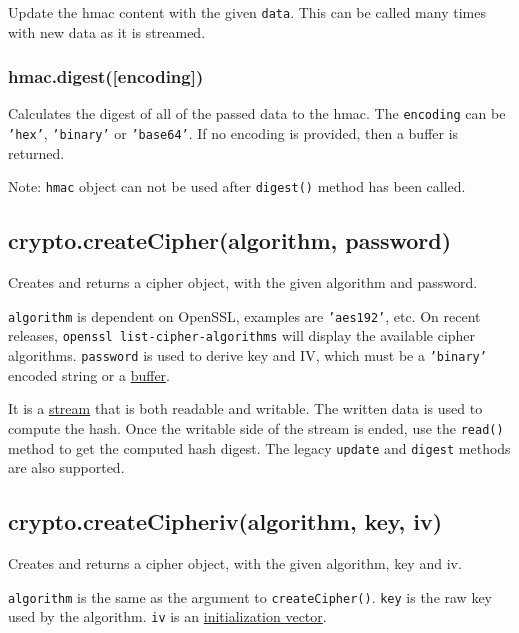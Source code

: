 Update the hmac content with the given \texttt{data}. This can be called
many times with new data as it is streamed.

\subsubsection{hmac.digest({[}encoding{]})}\label{hmac.digestencoding}

Calculates the digest of all of the passed data to the hmac. The
\texttt{encoding} can be \texttt{'hex'}, \texttt{'binary'} or
\texttt{'base64'}. If no encoding is provided, then a buffer is
returned.

Note: \texttt{hmac} object can not be used after \texttt{digest()}
method has been called.

\subsection{crypto.createCipher(algorithm,
password)}\label{crypto.createcipheralgorithm-password}

Creates and returns a cipher object, with the given algorithm and
password.

\texttt{algorithm} is dependent on OpenSSL, examples are
\texttt{'aes192'}, etc. On recent releases,
\texttt{openssl list-cipher-algorithms} will display the available
cipher algorithms. \texttt{password} is used to derive key and IV, which
must be a \texttt{'binary'} encoded string or a
\href{buffer.html}{buffer}.

It is a \href{stream.html}{stream} that is both readable and writable.
The written data is used to compute the hash. Once the writable side of
the stream is ended, use the \texttt{read()} method to get the computed
hash digest. The legacy \texttt{update} and \texttt{digest} methods are
also supported.

\subsection{crypto.createCipheriv(algorithm, key,
iv)}\label{crypto.createcipherivalgorithm-key-iv}

Creates and returns a cipher object, with the given algorithm, key and
iv.

\texttt{algorithm} is the same as the argument to
\texttt{createCipher()}. \texttt{key} is the raw key used by the
algorithm. \texttt{iv} is an
\href{http://en.wikipedia.org/wiki/Initialization_vector}{initialization
vector}.

